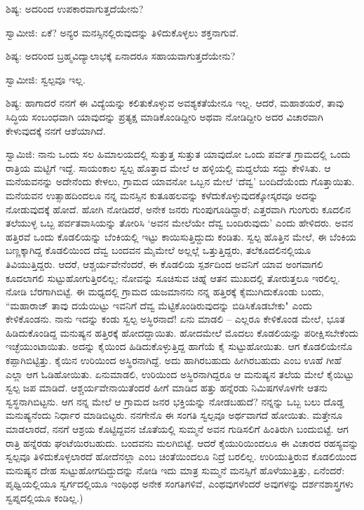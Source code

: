 ಶಿಷ್ಯ: ಅದರಿಂದ ಉಪಕಾರವಾಗುತ್ತದೆಯೇನು?

ಸ್ವಾಮೀಜಿ: ಏಕೆ? ಅನ್ಯರ ಮನಸ್ಸಿನಲ್ಲಿರುವುದನ್ನು ತಿಳಿದುಕೊಳ್ಳಲು ಶಕ್ತನಾಗುವೆ.

ಶಿಷ್ಯ: ಅದರಿಂದ ಬ್ರಹ್ಮವಿದ್ಯಾಲಾಭಕ್ಕೆ ಏನಾದರೂ ಸಹಾಯವಾಗುತ್ತದೆಯೇನು?

ಸ್ವಾಮೀಜಿ: ಸ್ವಲ್ಪವೂ ಇಲ್ಲ.

ಶಿಷ್ಯ: ಹಾಗಾದರೆ ನನಗೆ ಈ ವಿದ್ಯೆಯನ್ನು ಕಲಿತುಕೊಳ್ಳುವ ಅವಶ್ಯಕತೆಯೇನೂ ಇಲ್ಲ. ಆದರೆ, ಮಹಾಶಯರೆ, ತಾವು ಸಿದ್ಧಿಯ ಸಂಬಂಧವಾಗಿ ಯಾವುದನ್ನು ಪ್ರತ್ಯಕ್ಷ ಮಾಡಿಕೊಂಡಿದ್ದೀರಿ ಅಥವಾ ನೋಡಿದ್ದೀರಿ ಅದರ ವಿಚಾರವಾಗಿ ಕೇಳುವುದಕ್ಕೆ ನನಗೆ ಆಶೆಯಾಗಿದೆ.

ಸ್ವಾಮಿಜಿ: ನಾನು ಒಂದು ಸಲ ಹಿಮಾಲಯದಲ್ಲಿ ಸುತ್ತುತ್ತ ಸುತ್ತುತ ಯಾವುದೋ ಒಂದು ಪರ್ವತ ಗ್ರಾಮದಲ್ಲಿ ಒಂದು ರಾತ್ರಿಯ ಮಟ್ಟಿಗೆ ಇದ್ದೆ. ಸಾಯಂಕಾಲ ಸ್ವಲ್ಪ ಹೊತ್ತಾದ ಮೇಲೆ ಆ ಹಳ್ಳಿಯಲ್ಲಿ ಮದ್ದಲೆಯ ಸದ್ದು ಕೇಳಿಸಿತು. ಆ ಮನೆಯವನನ್ನು ಅದೇನೆಂದು ಕೇಳಲು, ಗ್ರಾಮದ ಯಾವನೋ ಒಬ್ಬನ ಮೇಲೆ ‘ದೆವ್ವ’ ಬಂದಿದೆಯೆಂದು ಗೊತ್ತಾಯಿತು. ಮನೆಯವನ ಉತ್ಸಾಹದಿಂದಲೂ ನನ್ನ ಮನಸ್ಸಿನ ಕುತೂಹಲವನ್ನು ಕಳೆದುಕೊಳ್ಳುವುದಕ್ಕೋಸ್ಕರವೂ ಅದನ್ನು ನೋಡುವುದಕ್ಕೆ ಹೋದೆ. ಹೋಗಿ ನೋಡಿದರೆ, ಅನೇಕ ಜನರು ಗುಂಪುಗೂಡಿದ್ದಾರೆ; ಎತ್ತರವಾಗಿ ಗುಂಗುರು ಕೂದಲಿನ ತಲೆಯುಳ್ಳ ಒಬ್ಬ ಪರ್ವತವಾಸಿಯನ್ನು ತೋರಿಸಿ ‘ಅವನ ಮೇಲೆಯೇ ದೆವ್ವ ಬಂದಿರುವುದು’ ಎಂದು ಹೇಳಿದರು. ಅವನ ಹತ್ತಿರವೆ ಒಂದು ಕೊಡಲಿಯನ್ನು ಬೆಂಕಿಯಲ್ಲಿ ಇಟ್ಟು ಕಾಯಿಸುತ್ತಿದ್ದುದು ಕಂಡಿತು. ಸ್ವಲ್ಪ ಹೊತ್ತಿನ ಮೇಲೆ, ಈ ಬೆಂಕಿಯ ಬಣ್ಣಕ್ಕಾಗಿದ್ದ ಕೊಡಲಿಯಿಂದ ದೆವ್ವ ಬಂದವನ ಮೈಮೇಲೆ ಅಲ್ಲಲ್ಲೆ ಒತ್ತುತ್ತಿದ್ದರು, ತಲೆಕೂದಲಿನಲ್ಲಿಯೂ ತಿವಿಯುತ್ತಿದ್ದರು. ಆದರೆ, ಆಶ್ಚರ್ಯವೇನೆಂದರೆ, ಈ ಕೊಡಲಿಯ ಸ್ಪರ್ಶದಿಂದ ಅವನಿಗೆ ಯಾವ ಅಂಗವಾಗಲಿ ಕೂದಲಾಗಲಿ ಸುಟ್ಟುಹೋಗುತ್ತಿರಲಿಲ್ಲ; ನೋವನ್ನು ಸೂಚಿಸುವ ಚಿಹ್ನೆ ಆತನ ಮುಖದಲ್ಲಿ ತೋರುತ್ತಲೂ ಇರಲಿಲ್ಲ. ನೋಡಿ ಬೆರಗಾಗಿಬಿಟ್ಟೆ. ಈ ಮಧ್ಯದಲ್ಲಿ ಗ್ರಾಮದ ಯಜಮಾನನು ನನ್ನ ಹತ್ತಿರಕ್ಕೆ ಕೈಮುಗಿದುಕೊಂಡು ಬಂದು, “ಮಹಾರಾಜ್ ತಾವು ದಯೆಯಿಟ್ಟು ಇವನಿಗೆ ದೆವ್ವ ಮೆಟ್ಟಿಕೊಂಡಿರುವುದನ್ನು ಬಿಡಿಸಿಕೊಡಬೇಕು" ಎಂದು ಕೇಳಿಕೊಂಡನು. ನಾನು ಇದನ್ನು ಕಂಡು ಸ್ವಲ್ಪ ಅಸ್ಥಿರನಾದೆ! ಏನು ಮಾಡಲಿ – ಎಲ್ಲರೂ ಕೇಳಿಕೊಂಡ ಮೇಲೆ, ಭೂತ ಹಿಡಿದುಕೊಂಡಿದ್ದ ಮನುಷ್ಯನ ಹತ್ತಿರಕ್ಕೆ ಹೋದದ್ದಾಯಿತು. ಹೋದಮೇಲೆ ಮೊದಲು ಕೊಡಲಿಯನ್ನು ಪರೀಕ್ಷಿಸಬೇಕೆಂದು ಇಚ್ಛೆಯುಂಟಾಯಿತು. ಅದನ್ನು ಕೈಯಿಂದ ಹಿಡಿದುಕೊಳ್ಳುತ್ತಿದ್ದ ಹಾಗೆಯೆ ಕೈ ಸುಟ್ಟುಹೋಯಿತು. ಆಗ ಕೊಡಲಿಯೇನೊ ಕಪ್ಪಾಗಿಬಿಟ್ಟಿತ್ತು. ಕೈಯಿನ ಉರಿಯಿಂದ ಅಸ್ಥಿರನಾಗಿದ್ದೆ. ಅದು ಹಾಗಿರಬಹುದು ಹೀಗಿರಬಹುದು ಎಂಬ ಊಹೆ ಗೀಹೆ ಎಲ್ಲಾ ಆಗ ಓಡಿಹೋಯಿತು. ಏನುಮಾಡಲಿ, ಉರಿಯಿಂದ ಅಸ್ಥಿರನಾಗಿದ್ದರೂ ಆ ಮನುಷ್ಯನ ತಲೆಯ ಮೇಲೆ ಕೈಯಿಟ್ಟು ಸ್ವಲ್ಪ ಜಪ ಮಾಡಿದೆ. ಆಶ್ಚರ್ಯವೇನಾಯಿತೆಂದರೆ ಹೀಗೆ ಮಾಡಿದ ಹತ್ತು ಹನ್ನೆರಡು ನಿಮಿಷಗಳೊಳಗೇ ಆತನು ಸ್ವಸ್ಥನಾಗಿಬಿಟ್ಟನು. ಆಗ ನನ್ನ ಮೇಲೆ ಆ ಗ್ರಾಮದ ಜನರ ಭಕ್ತಿಯನ್ನು ನೋಡಬಹುದೆ? ನನ್ನನ್ನು ಒಬ್ಬ ಬಲು ದೊಡ್ಡ ಮನುಷ್ಯನೆಂದು ನಿರ್ಧಾರ ಮಾಡಿಬಿಟ್ಟರು. ನನಗೇನೊ ಈ ಸಂಗತಿ ಸ್ವಲ್ಪವೂ ಅರ್ಥವಾಗದೆ ಹೋಯಿತು. ಮತ್ತೇನೂ ಮಾಡಲಾರದೆ, ನನಗೆ ಆಶ್ರಯ ಕೊಟ್ಟಿದ್ದವನ ಜೊತೆಯಲ್ಲಿ ಸುಮ್ಮನೆ ಅವನ ಗುಡಿಸಲಿಗೆ ಹಿಂತಿರುಗಿ ಬಂದುಬಿಟ್ಟೆ. ಆಗ ರಾತ್ರಿ ಹನ್ನೆರಡು ಘಂಟೆಯಿರಬಹುದು. ಬಂದವನು ಮಲಗಿಬಿಟ್ಟೆ. ಆದರೆ ಕೈಯುರಿಯಿಂದಲೂ ಈ ವಿಚಾರದ ರಹಸ್ಯವನ್ನು ಸ್ವಲ್ಪವೂ ತಿಳಿದುಕೊಳ್ಳಲಾರದೆ ಹೋದೆನಲ್ಲಾ ಎಂಬ ಚಿಂತೆಯಿಂದಲೂ ನಿದ್ರೆ ಬರಲಿಲ್ಲ. ಉರಿಯುತ್ತಿರುವ ಕೊಡಲಿಯಿಂದ ಮನುಷ್ಯನ ದೇಹ ಸುಟ್ಟುಹೋಗದಿದ್ದುದನ್ನು ನೋಡಿ ಇದು ಮಾತ್ರ ಸುಮ್ಮನೆ ಮನಸ್ಸಿಗೆ ಹೊಳೆಯುತ್ತಿತ್ತು, ಏನೆಂದರೆ:  ಪೃಥ್ವಿಯಲ್ಲಿಯೂ ಸ್ವರ್ಗದಲ್ಲಿಯೂ ಇಂಥಿಂಥ ಅನೇಕ ಸಂಗತಿಗಳಿವೆ, ಎಂಥವುಗಳೆಂದರೆ ಅವುಗಳನ್ನು ದರ್ಶನಶಾಸ್ತ್ರಗಳು ಸ್ವಪ್ನದಲ್ಲಿಯೂ ಕಂಡಿಲ್ಲ.)

